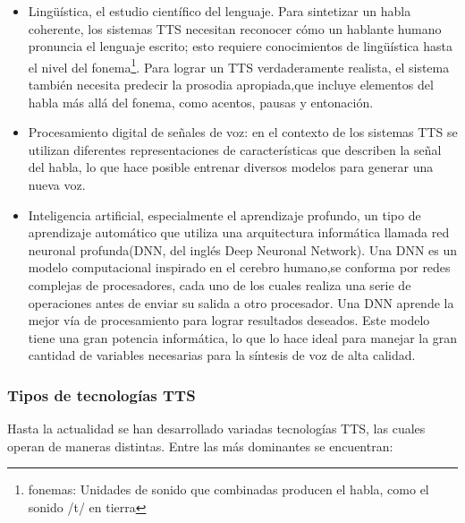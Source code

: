 \begin{itemize}
	\item Lingüística, el estudio científico del lenguaje. Para sintetizar un habla coherente, los sistemas TTS necesitan reconocer cómo un hablante humano pronuncia el lenguaje escrito; esto requiere conocimientos de lingüística hasta el nivel del fonema\footnote{fonemas: Unidades de sonido que combinadas producen el habla, como el sonido /t/ en tierra}. Para lograr un TTS verdaderamente realista, el sistema también necesita predecir la prosodia apropiada,que incluye elementos del habla más allá del fonema, como acentos, pausas y entonación.
	
	\item Procesamiento digital de señales de voz: en el contexto de los sistemas TTS se	utilizan diferentes representaciones de características que describen la señal del habla, lo que hace posible entrenar diversos modelos para generar una nueva
	voz.
	
	\item Inteligencia artificial, especialmente el aprendizaje profundo, un tipo de aprendizaje automático que utiliza una arquitectura informática llamada red neuronal profunda(DNN, del inglés Deep Neuronal Network). Una DNN es un modelo computacional inspirado en el cerebro humano,se conforma por redes complejas de procesadores, cada uno de los cuales realiza una serie de operaciones antes de enviar su salida a otro procesador. Una DNN aprende la mejor vía de procesamiento para lograr resultados deseados. Este modelo tiene una gran potencia informática, lo que lo hace ideal para manejar la gran cantidad de variables necesarias para la síntesis de voz de alta calidad.
\end{itemize}

\subsubsection*{Tipos de tecnologías TTS}

Hasta la actualidad se han desarrollado variadas tecnologías TTS, las cuales operan de maneras distintas. Entre las más dominantes se encuentran: 

